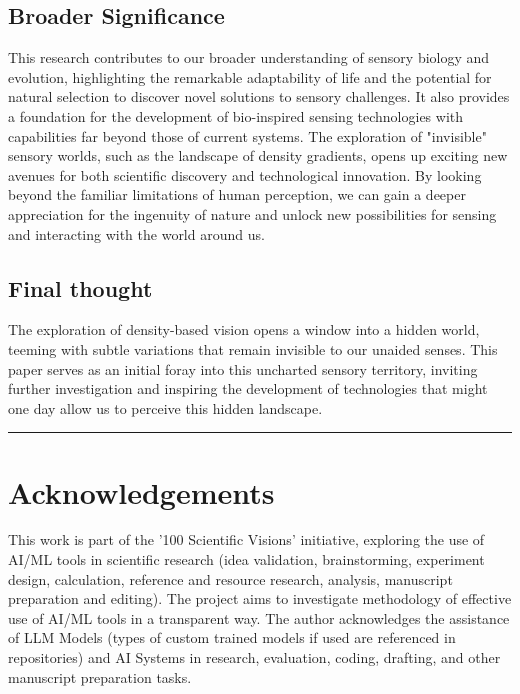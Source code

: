 \documentclass[11pt]{article}
\begin{document}
\subsection{Broader Significance}

This research contributes to our broader understanding of sensory biology and evolution, highlighting the remarkable adaptability of life and the potential for natural selection to discover novel solutions to sensory challenges. It also provides a foundation for the development of bio-inspired sensing technologies with capabilities far beyond those of current systems. The exploration of "invisible" sensory worlds, such as the landscape of density gradients, opens up exciting new avenues for both scientific discovery and technological innovation. By looking beyond the familiar limitations of human perception, we can gain a deeper appreciation for the ingenuity of nature and unlock new possibilities for sensing and interacting with the world around us.

\subsection{Final thought}
The exploration of density-based vision opens a window into a hidden world, teeming with subtle variations that remain invisible to our unaided senses. This paper serves as an initial foray into this uncharted sensory territory, inviting further investigation and inspiring the development of technologies that might one day allow us to perceive this hidden landscape.

\bigskip\noindent\rule{\linewidth}{0.4pt}\bigskip


\section*{Acknowledgements}
\label{sec:acknowledgements} %

This work is part of the '100 Scientific Visions' initiative, exploring the use of AI/ML tools in scientific research (idea validation, brainstorming, experiment design, calculation, reference and resource research, analysis, manuscript preparation and editing). The project aims to investigate methodology of effective use of AI/ML tools in a transparent way. The author acknowledges the assistance of LLM Models (types of custom trained models if used are referenced in repositories) and AI Systems in research, evaluation, coding, drafting, and other manuscript preparation tasks.
\end{document}
